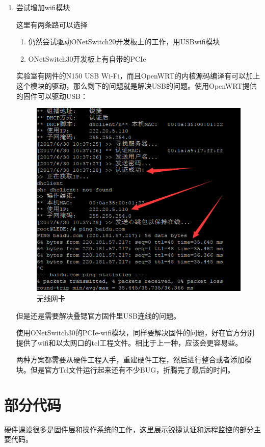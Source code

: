 \documentclass{itecreport-zh}
\begin{document}
\begin{enumerate}
    \item 尝试增加wifi模块


    这里有两条路可以选择
    \begin{enumerate}
      \item 仍然尝试驱动ONetSwitch20开发板上的工作，用USBwifi模块
      \item ONetSwitch30开发板上有自带的PCIe
    \end{enumerate}

      实验室有网件的N150 USB Wi-Fi，而且OpenWRT的内核源码编译有可以加上这个模块的驱动，那么剩下的问题就是解决USB的问题。使用OpenWRT提供的固件可以驱动USB：
      \begin{figure}[!h]
      \centering
      \includegraphics[width=\textwidth]{ruijie.png}
      \caption{无线网卡}
      \end{figure}
      但是还是需要解决叠锶官方固件里USB连线的问题。


      使用ONetSwitch30的PCIe-wifi模块，同样要解决固件的问题，好在官方分别提供了wifi和以太网口的tcl工程文件。相比于上一种，应该会更容易些。


      两种方案都需要从硬件工程入手，重建硬件工程，然后进行整合或者添加模块。但是官方Tcl文件运行起来还有不少BUG，折腾完了最后的时间。

\end{enumerate}
\section{部分代码}
硬件课设很多是固件层和操作系统的工作，这里展示锐捷认证和远程监控的部分主要代码。
\end{document}
